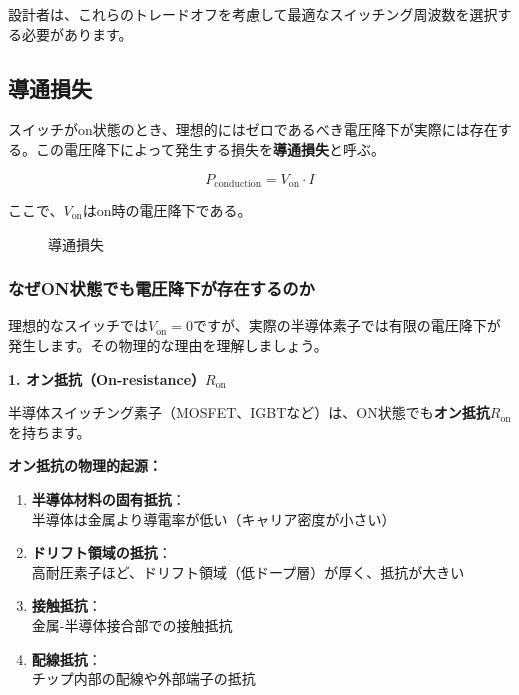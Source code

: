 設計者は、これらのトレードオフを考慮して最適なスイッチング周波数を選択する必要があります。

\subsection{導通損失}

スイッチがon状態のとき、理想的にはゼロであるべき電圧降下が実際には存在する。この電圧降下によって発生する損失を\textbf{導通損失}と呼ぶ。

\begin{equation}
P_{\text{conduction}} = V_{\text{on}} \cdot I
\end{equation}

ここで、$V_{\text{on}}$はon時の電圧降下である。

\begin{figure}[H]
\centering
{}
\caption{導通損失}
\label{fig:conduction_loss}
\end{figure}

\subsubsection{なぜON状態でも電圧降下が存在するのか}

理想的なスイッチでは$V_{\text{on}} = 0$ですが、実際の半導体素子では有限の電圧降下が発生します。その物理的な理由を理解しましょう。

\textbf{1. オン抵抗（On-resistance）$R_{\text{on}}$}

半導体スイッチング素子（MOSFET、IGBTなど）は、ON状態でも\textbf{オン抵抗}$R_{\text{on}}$を持ちます。

\begin{screen}
\textbf{オン抵抗の物理的起源：}

\begin{enumerate}
\item \textbf{半導体材料の固有抵抗}：\\
半導体は金属より導電率が低い（キャリア密度が小さい）

\item \textbf{ドリフト領域の抵抗}：\\
高耐圧素子ほど、ドリフト領域（低ドープ層）が厚く、抵抗が大きい

\item \textbf{接触抵抗}：\\
金属-半導体接合部での接触抵抗

\item \textbf{配線抵抗}：\\
チップ内部の配線や外部端子の抵抗
\end{enumerate}
\end{screen}

